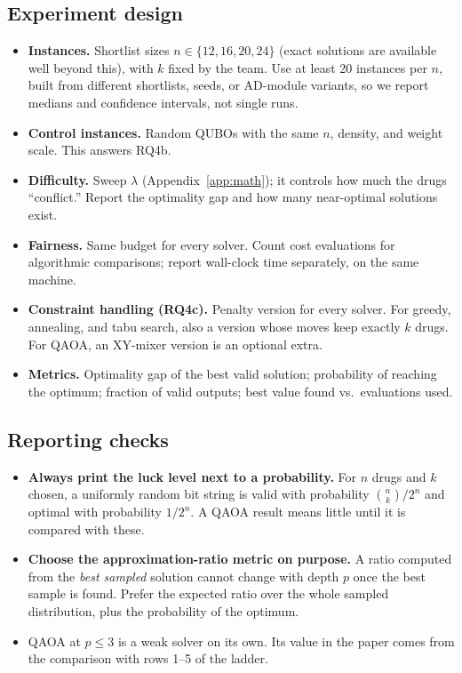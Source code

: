 \subsection{Experiment design}

\begin{itemize}[nosep]
  \item \textbf{Instances.} Shortlist sizes $n\in\{12,16,20,24\}$ (exact
        solutions are available well beyond this), with $k$ fixed by the team.
        Use at least 20 instances per $n$, built from different shortlists,
        seeds, or AD-module variants, so we report medians and confidence
        intervals, not single runs.
  \item \textbf{Control instances.} Random QUBOs with the same $n$, density,
        and weight scale. This answers RQ4b.
  \item \textbf{Difficulty.} Sweep $\lambda$ (Appendix~\ref{app:math}); it
        controls how much the drugs ``conflict.'' Report the optimality gap
        and how many near-optimal solutions exist.
  \item \textbf{Fairness.} Same budget for every solver. Count cost
        evaluations for algorithmic comparisons; report wall-clock time
        separately, on the same machine.
  \item \textbf{Constraint handling (RQ4c).} Penalty version for every solver.
        For greedy, annealing, and tabu search, also a version whose moves
        keep exactly $k$ drugs. For QAOA, an XY-mixer version is an optional
        extra.
  \item \textbf{Metrics.} Optimality gap of the best valid solution;
        probability of reaching the optimum; fraction of valid outputs; best
        value found vs.\ evaluations used.
\end{itemize}

\subsection{Reporting checks}

\begin{itemize}[nosep]
  \item \textbf{Always print the luck level next to a probability.} For $n$
        drugs and $k$ chosen, a uniformly random bit string is valid with
        probability $\binom{n}{k}/2^{n}$ and optimal with probability
        $1/2^{n}$. A QAOA result means little until it is compared with these.
  \item \textbf{Choose the approximation-ratio metric on purpose.} A ratio
        computed from the \emph{best sampled} solution cannot change with
        depth $p$ once the best sample is found. Prefer the expected ratio over
        the whole sampled distribution, plus the probability of the optimum.
  \item QAOA at $p\le 3$ is a weak solver on its own. Its value in the paper
        comes from the comparison with rows 1--5 of the ladder.
\end{itemize}

